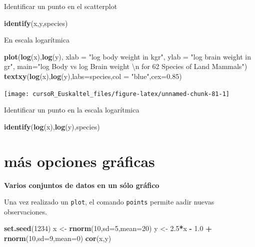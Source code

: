 \documentclass[]{book}
\newenvironment{Shaded}{\begin{snugshade}}{\end{snugshade}}
\newcommand{\KeywordTok}[1]{\textcolor[rgb]{0.13,0.29,0.53}{\textbf{#1}}}
\newcommand{\DataTypeTok}[1]{\textcolor[rgb]{0.13,0.29,0.53}{#1}}
\newcommand{\DecValTok}[1]{\textcolor[rgb]{0.00,0.00,0.81}{#1}}
\newcommand{\FloatTok}[1]{\textcolor[rgb]{0.00,0.00,0.81}{#1}}
\newcommand{\CharTok}[1]{\textcolor[rgb]{0.31,0.60,0.02}{#1}}
\newcommand{\StringTok}[1]{\textcolor[rgb]{0.31,0.60,0.02}{#1}}
\newcommand{\OperatorTok}[1]{\textcolor[rgb]{0.81,0.36,0.00}{\textbf{#1}}}
\newcommand{\NormalTok}[1]{#1}
\begin{document}
Identificar un punto en el scatterplot

\begin{Shaded}
\begin{Highlighting}[]
\KeywordTok{identify}\NormalTok{(x,y,species)}
\end{Highlighting}
\end{Shaded}

En escala logarítmica

\begin{Shaded}
\begin{Highlighting}[]
\KeywordTok{plot}\NormalTok{(}\KeywordTok{log}\NormalTok{(x),}\KeywordTok{log}\NormalTok{(y), }\DataTypeTok{xlab =} \StringTok{"log body weight in kgr"}\NormalTok{, }\DataTypeTok{ylab =} \StringTok{"log brain weight in gr"}\NormalTok{, }
     \DataTypeTok{main=}\StringTok{"log Body vs log Brain weight }\CharTok{\textbackslash{}n}\StringTok{ for 62 Species of Land Mammals"}\NormalTok{)}
\KeywordTok{textxy}\NormalTok{(}\KeywordTok{log}\NormalTok{(x),}\KeywordTok{log}\NormalTok{(y),}\DataTypeTok{labs=}\NormalTok{species,}\DataTypeTok{col =} \StringTok{"blue"}\NormalTok{,}\DataTypeTok{cex=}\FloatTok{0.85}\NormalTok{) }
\end{Highlighting}
\end{Shaded}

\begin{center}\texttt{[image: cursoR\_Euskaltel\_files/figure-latex/unnamed-chunk-81-1]} \end{center}

Identificar un punto en la escala logarítmica

\begin{Shaded}
\begin{Highlighting}[]
\KeywordTok{identify}\NormalTok{(}\KeywordTok{log}\NormalTok{(x),}\KeywordTok{log}\NormalTok{(y),species)}
\end{Highlighting}
\end{Shaded}

\section{más opciones gráficas}\label{mas-opciones-graficas}

\textbf{Varios conjuntos de datos en un sólo gráfico}

Una vez realizado un \texttt{plot}, el comando \texttt{points} permite
aadir nuevas observaciones.

\begin{Shaded}
\begin{Highlighting}[]
\KeywordTok{set.seed}\NormalTok{(}\DecValTok{1234}\NormalTok{)}
\NormalTok{ x <-}\StringTok{ }\KeywordTok{rnorm}\NormalTok{(}\DecValTok{10}\NormalTok{,}\DataTypeTok{sd=}\DecValTok{5}\NormalTok{,}\DataTypeTok{mean=}\DecValTok{20}\NormalTok{)}
\NormalTok{ y <-}\StringTok{ }\FloatTok{2.5}\OperatorTok{*}\NormalTok{x }\OperatorTok{-}\StringTok{ }\FloatTok{1.0} \OperatorTok{+}\StringTok{ }\KeywordTok{rnorm}\NormalTok{(}\DecValTok{10}\NormalTok{,}\DataTypeTok{sd=}\DecValTok{9}\NormalTok{,}\DataTypeTok{mean=}\DecValTok{0}\NormalTok{)}
 \KeywordTok{cor}\NormalTok{(x,y)}
\end{Highlighting}
\end{Shaded}
\end{document}
